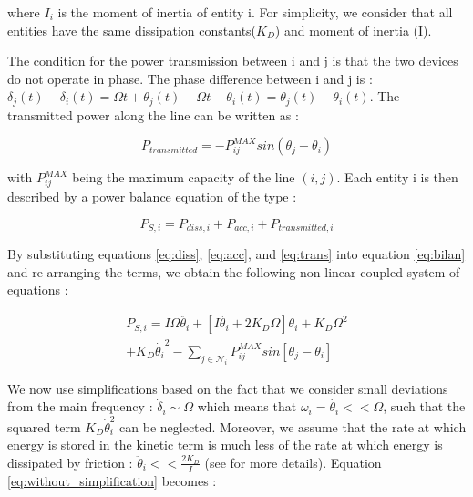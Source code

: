 \documentclass[conference]{IEEEtran}
\begin{document}
where $ I_{i}$ is the moment of inertia of entity i. For simplicity, we consider that all entities have the same dissipation constants($K_D$) and moment of inertia (I).

The condition for the power transmission between i and j is that the two devices do not operate in phase. The phase difference between i and j is : $ \delta_j(t) - \delta_i(t) = \Omega t + \theta_j(t) - \Omega t - \theta_i(t) = \theta_j(t) - \theta_i(t) $. The transmitted power along the line can be written as : 

\begin{equation}
\label{eq:trans}
 P_{transmitted} = - P_{ij}^{MAX} sin( \theta_j - \theta_i )
\end{equation}
  
with $ P_{ij}^{MAX} $ being the maximum capacity of the line $(i,j)$. Each entity i is then described by a power balance equation of the type :

\begin{equation}
\label{eq:bilan}
 P_{S,i}  =  P_{diss,i} + P_{acc,i} + P_{transmitted,i} 
\end{equation}

By substituting equations \ref{eq:diss}, \ref{eq:acc}, and \ref{eq:trans} into equation \ref{eq:bilan} and re-arranging the terms, we obtain the following non-linear coupled system of equations :

\begin{equation}
\label{eq:without_simplification}
\begin{array}{lll}
P_{S, i}  =  I \Omega \ddot{ \theta_i }  + \left[ I \ddot{ \theta_i } + 2 K_D \Omega \right] \dot{ \theta_i } + K_D \Omega^2 \\+ K_D \dot{ \theta_i }^2 - \sum_{j \in \mathcal{N}_i} P_{ij}^{MAX} sin \left[ \theta_j - \theta_i \right] \end{array}
\end{equation}

We now use simplifications based on the fact that we consider small deviations from the main frequency : $ \dot{ \delta}_i \sim \Omega $ which means that $ \omega_i = \dot{\theta_i} << \Omega $, such that the squared term $ K_D \dot{\theta}_i^2 $ can be neglected.
Moreover, we assume that the rate at which energy is stored in the kinetic term is much less of the rate at which energy is dissipated by friction : $ \ddot{ \theta }_i  << \frac{2 K_D}{I} $ (see \cite{Filatrella2008} for more details). Equation \ref{eq:without_simplification} becomes :
\end{document}
